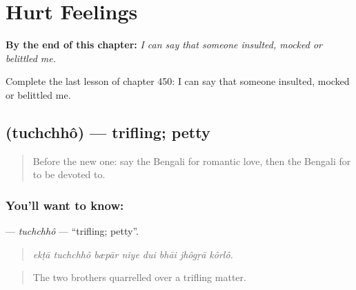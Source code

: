 
\chapter{Hurt Feelings}
\label{ch:bn-hurt-feelings}

\begin{chapteropening}
\textbf{By the end of this chapter:} \emph{I can say that someone insulted, mocked or belittled me.}

Complete the last lesson of chapter 450: I can say that someone insulted, mocked or belittled me.
\end{chapteropening}

\section[\texorpdfstring{\bn{তুচ্ছ} (tuchchhô)}{তুচ্ছ (tuchchhô)}]{ (tuchchhô) — trifling; petty}

\label{lesson:BN-C450-tuchchho}



\begin{quote}
Before the new one: say the Bengali for romantic love, then the Bengali for to be devoted to.
\end{quote}

\subsection*{You'll want to know: }
\textbf{} — \emph{tuchchhô} — \textquotedblleft{}trifling; petty\textquotedblright{}.

\begin{quote}
       
\end{quote}

\begin{quote}
\emph{ekṭā tuchchhô bæpār niye dui bhāi jhôgṛā kôrlô.}
\end{quote}

\begin{quote}
The two brothers quarrelled over a trifling matter.
\end{quote}

